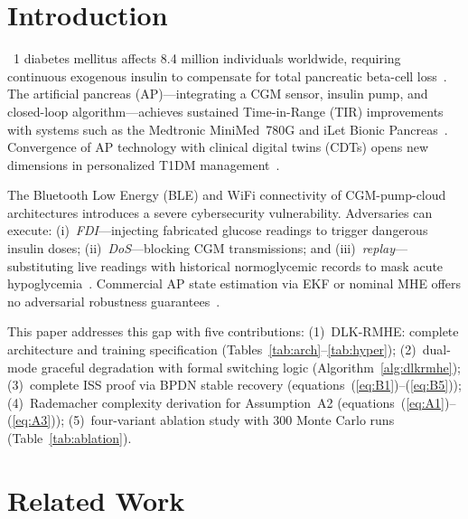 \documentclass[journal,twoside]{IEEEtran}
\begin{document}
\section{Introduction}\label{sec:intro}

~1 diabetes mellitus affects 8.4 million individuals worldwide,
requiring continuous exogenous insulin to compensate for total pancreatic beta-cell
loss~\cite{idf2021}. The artificial pancreas (AP)---integrating a CGM sensor,
insulin pump, and closed-loop algorithm---achieves sustained Time-in-Range (TIR)
improvements with systems such as the Medtronic MiniMed~780G and iLet Bionic
Pancreas~\cite{boughton2022,bhargava2022}. Convergence of AP technology with
clinical digital twins (CDTs) opens new dimensions in personalized T1DM
management~\cite{grieves2014,laubenbacher2021}.

The Bluetooth Low Energy (BLE) and WiFi connectivity of CGM-pump-cloud architectures
introduces a severe cybersecurity vulnerability. Adversaries can execute:
(i)~\emph{FDI}---injecting fabricated glucose readings to trigger dangerous insulin
doses; (ii)~\emph{DoS}---blocking CGM transmissions; and (iii)~\emph{replay}---
substituting live readings with historical normoglycemic records to mask acute
hypoglycemia~\cite{sevil2020,ransford2012}. Commercial AP state estimation via EKF
or nominal MHE offers no adversarial robustness guarantees~\cite{patek2012,chakrabarty2018}.

This paper addresses this gap with five contributions:
(1)~DLK-RMHE: complete architecture and training specification
(Tables~\ref{tab:arch}--\ref{tab:hyper});
(2)~dual-mode graceful degradation with formal switching logic
(Algorithm~\ref{alg:dlkrmhe});
(3)~complete ISS proof via BPDN stable recovery
(equations~(\ref{eq:B1})--(\ref{eq:B5}));
(4)~Rademacher complexity derivation for Assumption~A2
(equations~(\ref{eq:A1})--(\ref{eq:A3}));
(5)~four-variant ablation study with 300 Monte Carlo runs
(Table~\ref{tab:ablation}).

\section{Related Work}\label{sec:related}
\end{document}
